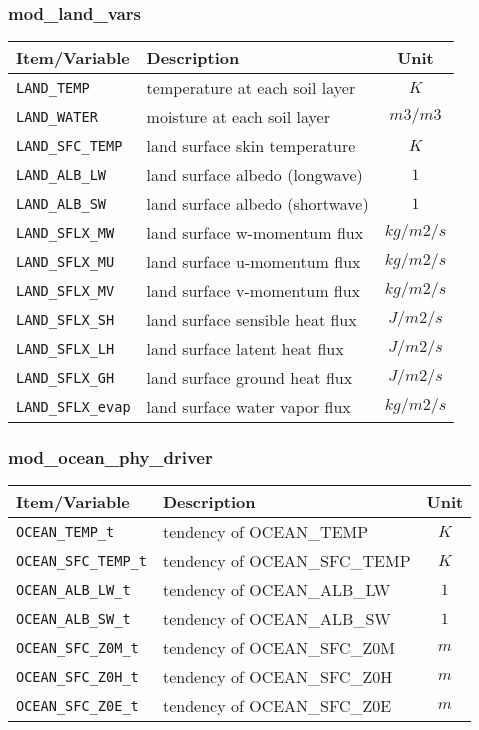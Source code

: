 \subsubsection{mod\_land\_vars}
 \begin{tabularx}{150mm}{|l|X|c|} \hline
 \rowcolor[gray]{0.9} Item/Variable & Description  & Unit \\\hline
  \verb|LAND_TEMP|       & temperature at each soil layer   &  $K$      \\\hline
  \verb|LAND_WATER|      & moisture at each soil layer      &  $m3/m3$  \\\hline
  \verb|LAND_SFC_TEMP|   & land surface skin temperature    &  $K$      \\\hline
  \verb|LAND_ALB_LW|     & land surface albedo (longwave)   &  $1$    \\\hline
  \verb|LAND_ALB_SW|     & land surface albedo (shortwave)  &  $1$    \\\hline
  \verb|LAND_SFLX_MW|    & land surface w-momentum flux     &  $kg/m2/s$ \\\hline
  \verb|LAND_SFLX_MU|    & land surface u-momentum flux     &  $kg/m2/s$ \\\hline
  \verb|LAND_SFLX_MV|    & land surface v-momentum flux     &  $kg/m2/s$ \\\hline
  \verb|LAND_SFLX_SH|    & land surface sensible heat flux  &  $J/m2/s$ \\\hline
  \verb|LAND_SFLX_LH|    & land surface latent heat flux    &  $J/m2/s$ \\\hline
  \verb|LAND_SFLX_GH|    & land surface ground heat flux    &  $J/m2/s$ \\\hline
  \verb|LAND_SFLX_evap|  & land surface water vapor flux    &  $kg/m2/s$ \\\hline
 \end{tabularx}

\subsubsection{mod\_ocean\_phy\_driver}
 \begin{tabularx}{150mm}{|l|X|c|} \hline
 \rowcolor[gray]{0.9} Item/Variable & Description  & Unit \\\hline
  \verb|OCEAN_TEMP_t|     & tendency of OCEAN\_TEMP     & $K$ \\\hline
  \verb|OCEAN_SFC_TEMP_t| & tendency of OCEAN\_SFC\_TEMP & $K$ \\\hline
  \verb|OCEAN_ALB_LW_t|   & tendency of OCEAN\_ALB\_LW   & $1$ \\\hline
  \verb|OCEAN_ALB_SW_t|   & tendency of OCEAN\_ALB\_SW   & $1$ \\\hline
  \verb|OCEAN_SFC_Z0M_t|  & tendency of OCEAN\_SFC\_Z0M  & $m$ \\\hline
  \verb|OCEAN_SFC_Z0H_t|  & tendency of OCEAN\_SFC\_Z0H  & $m$ \\\hline
  \verb|OCEAN_SFC_Z0E_t|  & tendency of OCEAN\_SFC\_Z0E  & $m$ \\\hline
 \end{tabularx}

